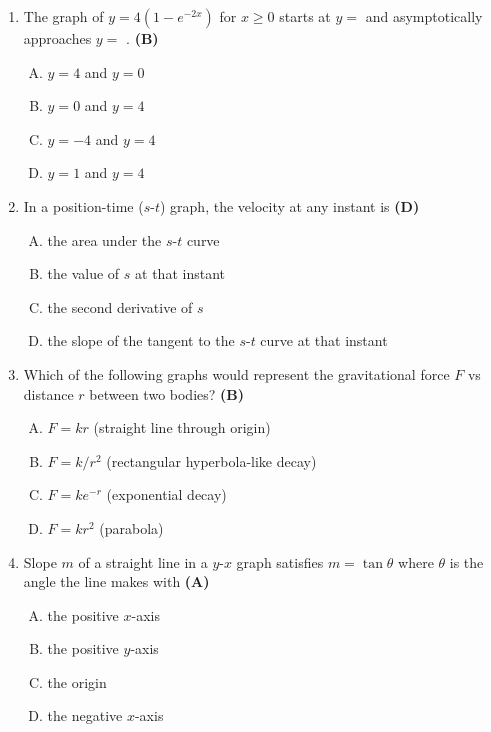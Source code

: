 \documentclass[10pt,a4paper]{article}
\begin{document}
\begin{enumerate}[1.]
\item The graph of $y = 4(1 - e^{-2x})$ for $x \geq 0$ starts at $y = $ \underline{\phantom{XX}} and asymptotically approaches $y = $ \underline{\phantom{XX}}. \hfill \textbf{(B)}
\begin{enumerate}[(A)]
    \item $y=4$ and $y=0$
    \item $y=0$ and $y=4$
    \item $y=-4$ and $y=4$
    \item $y=1$ and $y=4$
\end{enumerate}

\item In a position-time ($s$-$t$) graph, the velocity at any instant is \hfill \textbf{(D)}
\begin{enumerate}[(A)]
    \item the area under the $s$-$t$ curve
    \item the value of $s$ at that instant
    \item the second derivative of $s$
    \item the slope of the tangent to the $s$-$t$ curve at that instant
\end{enumerate}

\item Which of the following graphs would represent the gravitational force $F$ vs distance $r$ between two bodies? \hfill \textbf{(B)}
\begin{enumerate}[(A)]
    \item $F = kr$ (straight line through origin)
    \item $F = k/r^2$ (rectangular hyperbola-like decay)
    \item $F = ke^{-r}$ (exponential decay)
    \item $F = kr^2$ (parabola)
\end{enumerate}

\item Slope $m$ of a straight line in a $y$-$x$ graph satisfies $m = \tan\theta$ where $\theta$ is the angle the line makes with \hfill \textbf{(A)}
\begin{enumerate}[(A)]
    \item the positive $x$-axis
    \item the positive $y$-axis
    \item the origin
    \item the negative $x$-axis
\end{enumerate}


\end{enumerate}
\end{document}

